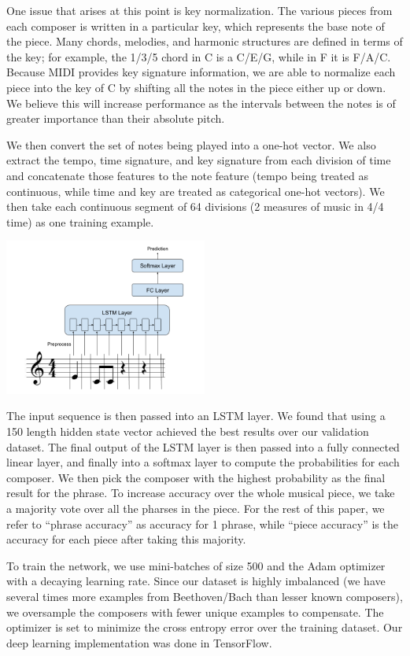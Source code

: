 \documentclass[11pt,a4paper]{article}
\begin{document}
One issue that arises at this point is key normalization. The various pieces from each composer is written in a particular key, which represents the base note of the piece. Many chords, melodies, and harmonic structures are defined in terms of the key; for example, the 1/3/5 chord in C is a C/E/G, while in F it is F/A/C. Because MIDI provides key signature information, we are able to normalize each piece into the key of C by shifting all the notes in the piece either up or down. We believe this will increase performance as the intervals between the notes is of greater importance than their absolute pitch.

We then convert the set of notes being played into a one-hot vector. We also extract the tempo, time signature, and key signature from each division of time and concatenate those features to the note feature (tempo being treated as continuous, while time and key are treated as categorical one-hot vectors). We then take each continuous  segment of 64 divisions (2 measures of music in 4/4 time) as one training example.

\includegraphics[width=0.5\textwidth]{Architecture.png}

The input sequence is then passed into an LSTM layer. We found that using a 150 length hidden state vector achieved the best results over our validation dataset. The final output of the LSTM layer is then passed into a fully connected linear layer, and finally into a softmax layer to compute the probabilities for each composer. We then pick the composer with the highest probability as the final result for the phrase. To increase accuracy over the whole musical piece, we take a majority vote over all the pharses in the piece. For the rest of this paper, we refer to ``phrase accuracy'' as accuracy for 1 phrase, while ``piece accuracy'' is the accuracy for each piece after taking this majority. 

To train the network, we use mini-batches of size 500 and the Adam optimizer with a decaying learning rate. Since our dataset is highly imbalanced (we have several times more examples from Beethoven/Bach than lesser known composers), we oversample the composers with fewer unique examples to compensate. The optimizer is set to minimize the cross entropy error over the training dataset. Our deep learning implementation was done in TensorFlow.
\end{document}
